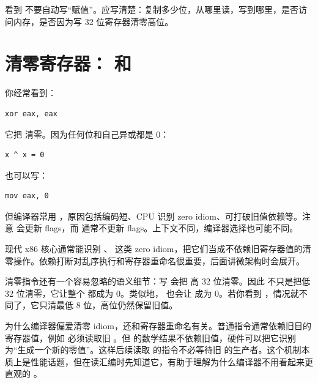\begin{warningbox}
看到  不要自动写“赋值”。应写清楚：复制多少位，从哪里读，写到哪里，是否访问内存，是否因为写 32 位寄存器清零高位。
\end{warningbox}

\section{清零寄存器： 和 }

你经常看到：

\begin{lstlisting}
xor eax, eax
\end{lstlisting}

它把  清零。因为任何位和自己异或都是 0：

\begin{lstlisting}
x ^ x = 0
\end{lstlisting}

也可以写：

\begin{lstlisting}
mov eax, 0
\end{lstlisting}

但编译器常用 ，原因包括编码短、CPU 识别 zero idiom、可打破旧值依赖等。注意  会更新 flags，而  通常不更新 flags。上下文不同，编译器选择也可能不同。

\begin{deepdive}
现代 x86 核心通常能识别 、 这类 zero idiom，把它们当成不依赖旧寄存器值的清零操作。依赖打断对乱序执行和寄存器重命名很重要，后面讲微架构时会展开。
\end{deepdive}

清零指令还有一个容易忽略的语义细节：写  会把  高 32 位清零。因此  不只是把低 32 位清零，它让整个  都成为 0。类似地， 也会让  成为 0。若你看到 ，情况就不同了，它只清最低 8 位，高位仍然保留旧值。

为什么编译器偏爱清零 idiom，还和寄存器重命名有关。普通指令通常依赖旧目的寄存器值，例如  必须读取旧 。但  的数学结果不依赖旧值，硬件可以把它识别为“生成一个新的零值”。这样后续读取  的指令不必等待旧  的生产者。这个机制本质上是性能话题，但在读汇编时先知道它，有助于理解为什么编译器不用看起来更直观的 。

